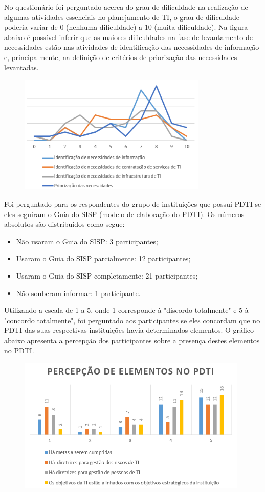 No questionário foi perguntado acerca do grau de dificuldade na realização de algumas atividades essenciais no planejamento de TI, o grau de dificuldade poderia variar de 0 (nenhuma dificuldade) a 10 (muita dificuldade). Na figura abaixo é possível inferir que as maiores dificuldades na fase de levantamento de necessidades estão nas atividades de identificação das necessidades de informação e, principalmente, na definição de critérios de priorização das necessidades levantadas. 
\begin{figure}[h]
\centering %
\includegraphics[width=9cm]{figuras/grafico_dificuldades.png}
\end{figure}

Foi perguntado para os respondentes do grupo de instituições que possui PDTI se eles seguiram o Guia do SISP (modelo de elaboração do PDTI). Os números absolutos são distribuídos como segue:
\begin{itemize}
\item Não usaram o Guia do SISP: 3 participantes;
\item Usaram o Guia do SISP parcialmente: 12 participantes;
\item Usaram o Guia do SISP completamente: 21 participantes;
\item Não souberam informar: 1 participante.
\end{itemize}

Utilizando a escala de 1 a 5, onde 1 corresponde à "discordo totalmente" e 5 à "concordo totalmente", foi perguntado aos participantes se eles concordam que no PDTI das suas respectivas instituições havia determinados elementos. O gráfico abaixo apresenta a percepção dos participantes sobre a presença destes elementos no PDTI.

\begin{figure}[h]
\centering %
\includegraphics[width=11cm]{figuras/apendiceC_percepcaoelementos.png}
\end{figure}

